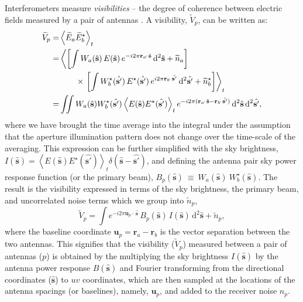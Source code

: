 \documentclass[a4paper,fleqn,usenatbib]{../mnras}
\newcommand{\dif}{\mathrm{d}}
\begin{document}
Interferometers measure {\it visibilities} -- the degree of coherence between
electric fields measured by a pair of antennas \citep{van34,zer38,tho01}.
A visibility, $\widetilde{V}_p$, can be written as:
\begin{align}
  \widetilde{V}_p = &\left\langle \widetilde{E}_a\widetilde{E}_b^\star \right\rangle_t \label{eqn:cc-vis}\hfill\\
  		= &\left\langle \left[ \int {W}_a(\hat{\mathbf{s}})\,E(\hat{\mathbf{s}})\,e^{-i2\pi\mathbf{r}_a\!\cdot\,\hat{\mathbf{s}}}\,\dif^2\hat{\mathbf{s}} + \widetilde{n}_a \right] \right. \nonumber\\
		&\qquad \times \left.\left[ \int {W}^\star_b(\hat{\mathbf{s'}})\,E^\star (\hat{\mathbf{s'}})\,e^{i2\pi\mathbf{r}_b\!\cdot\,\hat{\mathbf{s'}}}\,\dif^2\hat{\mathbf{s'}} + \widetilde{n}^\star_b \right] \right\rangle_t \\
                  =& \iint {W}_a(\hat{\mathbf{s}}) {W}^\star_b(\hat{\mathbf{s'}}) \left\langle E(\hat{\mathbf{s}}) E^\star(\hat{\mathbf{s'}}) \right\rangle_t e^{-i2\pi(\mathbf{r}_a\!\cdot\,\hat{\mathbf{s}}-\mathbf{r}_b\!\cdot\,\hat{\mathbf{s'}})}\,\dif^2\hat{\mathbf{s}}\,\dif^2\hat{\mathbf{s'}},
\end{align}
where we have brought the time average into the integral under the assumption that 
the aperture illumination pattern does not change over the time-scale of the 
averaging. This expression can be further simplified with the sky brightness, 
$I(\hat{\mathbf{s}})= \left\langle E(\hat{\mathbf{s}}) E^\star(\hat{\mathbf{s'}}) 
\right\rangle_t  \delta(\hat{\mathbf{s}}-\hat{\mathbf{s'}})$, and defining the 
antenna pair sky power response function (or the primary beam), 
$B_p(\hat{\mathbf{s}})~\equiv~{W}_a(\hat{\mathbf{s}})~{W}^\star_b(\hat{\mathbf{s}})$. 
The result is the visibility expressed in terms of the sky brightness, the primary 
beam, and uncorrelated noise terms which we group into $\widetilde{n}_p$,
\begin{equation}
\widetilde{V}_p = \int e^{-i2\pi\mathbf{u}_p\!\cdot\,\hat{\mathbf{s}}}\,B_p(\hat{\mathbf{s}})\,I(\hat{\mathbf{s}})\,\dif^2\hat{\mathbf{s}} + \widetilde{n}_p,
\end{equation}
where the baseline coordinate $\mathbf{u}_p=\mathbf{r}_a-\mathbf{r}_b$ is the 
vector separation between the two antennas. This signifies that the visibility 
($\widetilde{V}_p$) measured between a
pair of antennas ($p$) is obtained by the multiplying the sky brightness
$I(\hat{\mathbf{s}})$ by the antenna power response $B(\hat{\mathbf{s}})$ and
Fourier transforming from the directional coordinates ($\hat{\mathbf{s}}$) to $uv$
coordinates, which are then sampled at the locations of the antenna spacings (or
baselines), namely, $\mathbf{u}_p$, and added to the receiver noise $n_p$. 
\end{document}

